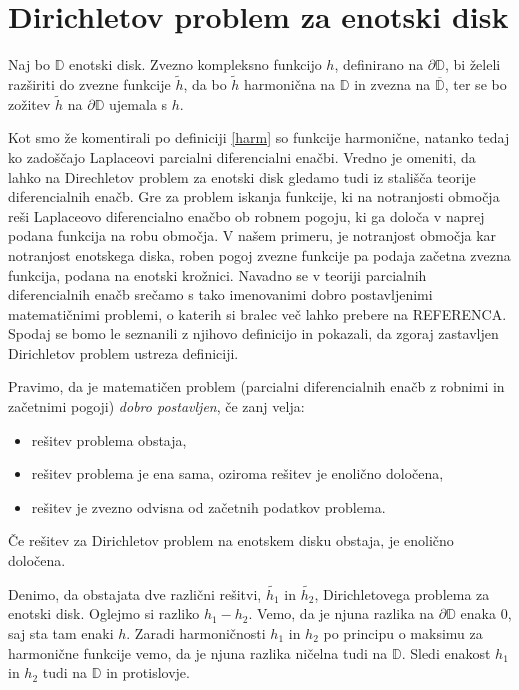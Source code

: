 \documentclass[mat1]{fmfdelo}
\begin{document}
\section{Dirichletov problem za enotski disk}
    Naj bo $\mathbb{D}$ enotski disk. Zvezno kompleksno funkcijo $h$, definirano na $\partial \mathbb{D}$, bi želeli razširiti do zvezne funkcije $\widetilde{h}$, da bo $\widetilde{h}$ harmonična na $\mathbb{D}$ in zvezna na $\overline{\mathbb{D}}$, ter se bo zožitev $\widetilde{h}$ na $\partial \mathbb{D}$ ujemala s $h$.

    Kot smo že komentirali po definiciji \ref{harm} so funkcije harmonične, natanko tedaj ko zadoščajo Laplaceovi parcialni diferencialni enačbi.   
    Vredno je omeniti, da lahko na Direchletov problem za enotski disk gledamo tudi iz stališča teorije diferencialnih enačb. Gre za problem iskanja funkcije, ki na notranjosti območja reši Laplaceovo diferencialno enačbo ob robnem pogoju, ki ga določa v naprej podana funkcija na robu območja.     
    V našem primeru, je notranjost območja kar notranjost enotskega diska, roben pogoj zvezne funkcije pa podaja začetna zvezna funkcija, podana na enotski krožnici.
    Navadno se v teoriji parcialnih diferencialnih enačb srečamo s tako imenovanimi dobro postavljenimi matematičnimi problemi, o katerih si bralec več lahko prebere na REFERENCA.     
    Spodaj se bomo le seznanili z njihovo definicijo in pokazali, da zgoraj zastavljen Dirichletov problem ustreza definiciji. 

    \begin{definicija}[J. Hadamard 1902]
        Pravimo, da je matematičen problem (parcialni diferencialnih enačb z robnimi in začetnimi pogoji) \emph{dobro postavljen}, če zanj velja:
        \begin{itemize}
            \item rešitev problema obstaja,
            \item rešitev problema je ena sama, oziroma rešitev je enolično določena,
            \item rešitev je zvezno odvisna od začetnih podatkov problema.
        \end{itemize}
    \end{definicija}

    \begin{lema}
        \label{enolicno}
        Če rešitev za Dirichletov problem na enotskem disku obstaja, je enolično določena.
    \end{lema}
    \begin{dokaz}
        Denimo, da obstajata dve različni rešitvi, $\widetilde{h_1}$ in $\widetilde{h_2}$, Dirichletovega problema za enotski disk.
        Oglejmo si razliko $h_1 - h_2$. Vemo, da je njuna razlika na $\partial \mathbb{D}$ enaka $0$, saj sta tam enaki $h$. 
        Zaradi harmoničnosti $h_1$ in $h_2$ po principu o maksimu za harmonične funkcije vemo, da je njuna razlika ničelna tudi na $\mathbb{D}$. Sledi enakost $h_1$ in $h_2$ tudi na $\mathbb{D}$ in protislovje. 
    \end{dokaz}
    
\end{document}
